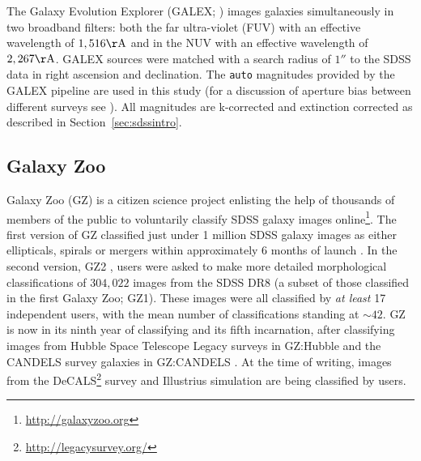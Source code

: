 The Galaxy Evolution Explorer (GALEX; \citealt{Martin05}) images galaxies simultaneously in two broadband filters: both the far ultra-violet (FUV) with an effective wavelength of $1,516\rm{\AA}$ and in the NUV with an effective wavelength of $2,267\rm{\AA}$. GALEX sources were matched with a search radius of $1''$ to the SDSS data in right ascension and declination. The {\tt auto} magnitudes provided by the GALEX pipeline are used in this study (for a discussion of aperture bias between different surveys see \citealt{hill11}). All magnitudes are k-corrected and extinction corrected as described in Section~\ref{sec:sdssintro}.

\subsection{Galaxy Zoo}\label{sec:GZ}

Galaxy Zoo (GZ) is a citizen science project enlisting the help of thousands of members of the public to voluntarily classify SDSS galaxy images online\footnote{\url{http://galaxyzoo.org}}. The first version of GZ classified just under 1 million SDSS galaxy images as either ellipticals, spirals or mergers within approximately 6 months of launch \citep{lintott08, Lintott11}. In the second version, GZ2 \citep{GZ2}, users were asked to make more detailed morphological classifications of $304, 022$ images from the SDSS DR8 (a subset of those classified in the first Galaxy Zoo; GZ1). These images were all classified by \emph{at least} 17 independent users, with the mean number of classifications standing at $\sim42$. GZ is now in its ninth year of classifying and its fifth incarnation, after classifying images from Hubble Space Telescope Legacy surveys in GZ:Hubble \citep{willett16} and the CANDELS survey galaxies in GZ:CANDELS \citep{simmons16}. At the time of writing, images from the DeCALS\footnote{\url{http://legacysurvey.org/}} survey and Illustrius simulation \citep{vogelsberger14, genel14} are being classified by users. 

